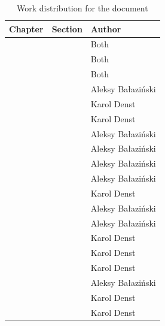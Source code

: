 \begin{table}[h]
    \centering
    \begin{tabular}{|l|l|l|}
    \hline
    Chapter  & Section    & Author        \\ \hline
    \nameref{ch:introduction} &  & Both \\
    \nameref{sec:division_of_work} &  & Both \\
    \nameref{ch:functional_specification} & & Both \\
    \nameref{ch:theoretical_foundations} & \nameref{sec:non_euclidean_geometry} & Aleksy Bałaziński      \\
    \nameref{ch:theoretical_foundations} & \nameref{sec:theory_theory_marching_cubes} & Karol Denst      \\
    \nameref{ch:theoretical_foundations} & \nameref{sec:theory_theory_models} & Karol Denst      \\
    \nameref{ch:theoretical_foundations} & \nameref{sec:theory_theory_day_night_cycle} & Aleksy Bałaziński      \\
    \nameref{ch:theoretical_foundations} & \nameref{sec:theory_theory_lighting} & Aleksy Bałaziński      \\
    \nameref{ch:implementation} & \nameref{sec:technologies_selection} & Aleksy Bałaziński      \\
    \nameref{ch:implementation} & \nameref{sec:game_objects_management} & Aleksy Bałaziński      \\
    \nameref{ch:implementation} & \nameref{sec:implementation_terrain} & Karol Denst      \\
    \nameref{ch:implementation} & \nameref{sec:chunk-worker} & Aleksy Bałaziński      \\
    \nameref{ch:implementation} & \nameref{sec:implementation_rendering} & Aleksy Bałaziński      \\
    \nameref{ch:implementation} & \nameref{sec:two_dimensional_graphics} & Karol Denst      \\
    \nameref{ch:testing} & & Karol Denst \\
    \nameref{ch:user_manual} & & Karol Denst \\
    \nameref{ch:results} & & Aleksy Bałaziński \\
    \nameref{ch:problems} & & Karol Denst \\
    \nameref{ch:improvements} & & Karol Denst \\
    \hline
    \end{tabular}
    \caption{Work distribution for the document}
    \label{tab:division_of_work_on_the_document}
\end{table}
